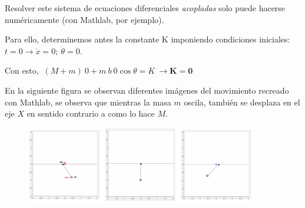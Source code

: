 \vspace{5mm}
Resolver este sistema de ecuaciones diferenciales \emph{acopladas} solo puede hacerse numéricamente (con Mathlab, por ejemplo).

Para ello, determinemos antes la constante K imponiendo condiciones iniciales: $t=0 \to \dot x=0;\ \dot \theta=0$. 

Con esto, $\ (M+m)\ 0 + m\ b\ 0\cos \theta = K \ \to \boldsymbol{K=0}$

En la siguiente figura se observan diferentes imágenes del movimiento recreado con Mathlab, se observa que mientras la masa $m$ oscila, también se desplaza en el eje $X$ en sentido contrario a como lo hace $M$.


\vspace{5mm}
\begin{figure}[H]
		\centering
		\includegraphics[width=0.9\textwidth]{imagenes/img03-02.png}
		\end{figure}


